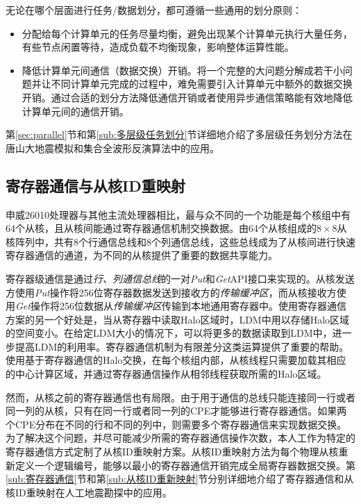 \documentclass[degree=doctor]{thuthesis}
\begin{document}
无论在哪个层面进行任务/数据划分，都可遵循一些通用的划分原则：
\begin{itemize}
  \item 分配给每个计算单元的任务尽量均衡，避免出现某个计算单元执行大量任务，有些节点闲置等待，造成负载不均衡现象，影响整体运算性能。
  \item 降低计算单元间通信（数据交换）开销。将一个完整的大问题分解成若干小问题并让不同计算单元完成的过程中，难免需要引入计算单元中额外的数据交换开销。通过合适的划分方法降低通信开销或者使用异步通信策略能有效地降低计算单元间的通信开销。
\end{itemize}

第\ref{sec:parallel}节和第\ref{sub:多层级任务划分}节详细地介绍了多层级任务划分方法在唐山大地震模拟和集合全波形反演算法中的应用。

\subsection{寄存器通信与从核ID重映射}

申威26010处理器与其他主流处理器相比，最与众不同的一个功能是每个核组中有64个从核，且从核间能通过寄存器通信机制交换数据。由64个从核组成的$8\times8$从核阵列中，共有8个行通信总线和8个列通信总线，这些总线成为了从核间进行快速寄存器通信的通道，为不同的从核提供了重要的数据共享能力。

寄存器级通信是通过\emph{行、列通信总线}的一对\emph{Put}和\emph{Get}API接口来实现的。从核发送方使用\emph {Put}操作将256位寄存器数据发送到接收方的\emph{传输缓冲区}，而从核接收方使用\emph{Get}操作将256位数据从\emph{传输缓冲区}传输到本地通用寄存器中。使用寄存器通信方案的另一个好处是，当从寄存器中读取Halo区域时，LDM中用以存储Halo区域的空间变小。在给定LDM大小的情况下，可以将更多的数据读取到LDM中，进一步提高LDM的利用率。寄存器通信机制为有限差分这类运算提供了重要的帮助。使用基于寄存器通信的Halo交换，在每个核组内部，从核线程只需要加载其相应的中心计算区域，并通过寄存器通信操作从相邻线程获取所需的Halo区域。

然而，从核之前的寄存器通信也有局限。由于用于通信的总线只能连接同一行或者同一列的从核，只有在同一行或者同一列的CPE才能够进行寄存器通信。如果两个CPE分布在不同的行和不同的列中，则需要多个寄存器通信来实现数据交换。为了解决这个问题，并尽可能减少所需的寄存器通信操作次数，本人工作为特定的寄存器通信方式定制了从核ID重映射方案。从核ID重映射方法为每个物理从核重新定义一个逻辑编号，能够以最小的寄存器通信开销完成全局寄存器数据交换。第\ref{sub:寄存器通信}节和第\ref{sub:从核ID重新映射}节分别详细地介绍了寄存器通信和从核ID重映射在人工地震勘探中的应用。
\end{document}
